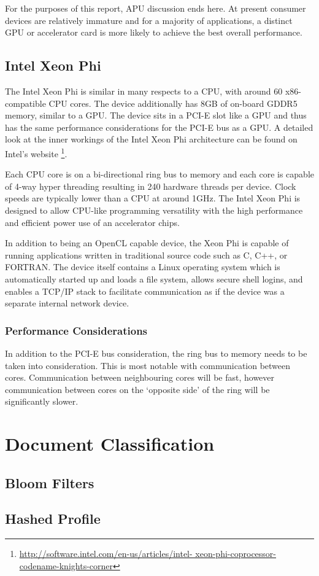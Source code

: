 For the purposes of this report, APU discussion ends here. At present consumer
devices are relatively immature and for a majority of applications, a distinct
GPU or accelerator card is more likely to achieve the best overall performance.

\subsection{Intel Xeon Phi}

The Intel Xeon Phi is similar in many respects to a CPU, with around 60
x86-compatible CPU cores. The device additionally has 8GB of on-board GDDR5
memory, similar to a GPU. The device sits in a PCI-E slot like a GPU and thus
has the same performance considerations for the PCI-E bus as a GPU. A detailed
look at the inner workings of the Intel Xeon Phi architecture can be found on
Intel's website \footnote{\url{http://software.intel.com/en-us/articles/intel-
xeon-phi-coprocessor-codename-knights-corner}}.

Each CPU core is on a bi-directional ring bus to memory and each core is capable
of 4-way hyper threading resulting in 240 hardware threads per device. Clock
speeds are typically lower than a CPU at around 1GHz. The Intel Xeon Phi is
designed to allow CPU-like programming versatility with the high performance and
efficient power use of an accelerator chips.

In addition to being an OpenCL capable device, the Xeon Phi is capable of
running applications written in traditional source code such as C, C++, or
FORTRAN. The device itself contains a Linux operating system which is
automatically started up and loads a file system, allows secure shell logins,
and enables a TCP/IP stack to facilitate communication as if the device was a
separate internal network device.

\subsubsection{Performance Considerations}

In addition to the PCI-E bus consideration, the ring bus to memory needs to be
taken into consideration. This is most notable with communication between cores.
Communication between neighbouring cores will be fast, however communication
between cores on the `opposite side' of the ring will be significantly slower.

\section{Document Classification}

\subsection{Bloom Filters}

\subsection{Hashed Profile}

